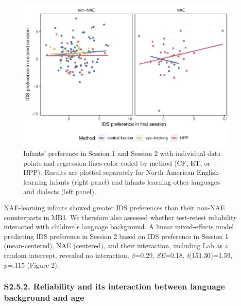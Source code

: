 \documentclass[
  man, donotrepeattitle,floatsintext]{apa6}
\begin{document}
\begin{figure}
\centering
\includegraphics{MB1T_supplement_files/figure-latex/unnamed-chunk-15-1.pdf}
\caption{\label{fig:unnamed-chunk-15}Infants' preference in Session 1 and Session 2 with individual data points and regression lines color-coded by method (CF, ET, or HPP). Results are plotted separately for North American English-learning infants (right panel) and infants learning other languages and dialects (left panel).}
\end{figure}

NAE-learning infants showed greater IDS preferences than their non-NAE counterparts in MB1.
We therefore also assessed whether test-retest reliability interacted with children's language background.
A linear mixed-effects model predicting IDS preference in Session 2 based on IDS preference in Session 1 (mean-centered), NAE (centered), and their interaction, including Lab as a random intercept, revealed no interaction, \(\beta\)=0.29, \emph{SE}=0.18, \emph{t}(151.30)=1.59, \emph{p}=.115 (Figure 2).

\hypertarget{s2.5.2.-reliability-and-its-interaction-between-language-background-and-age}{%
\subsubsection{S2.5.2. Reliability and its interaction between language background and age}\label{s2.5.2.-reliability-and-its-interaction-between-language-background-and-age}}
\end{document}
